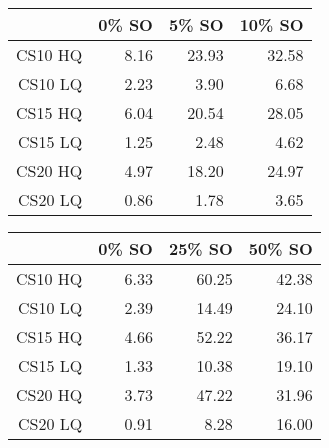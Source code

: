 \begin{table}[ht]
\begin{center}
\begin{tabular}{rrrr}
  \hline
 & 0\% SO & 5\% SO & 10\% SO \\
  \hline
 \small{CS10 HQ} & \small{8.16 }& \small{23.93 }& \small{32.58 }\\
 \small{CS10 LQ }& \small{2.23 }& \small{3.90 }& \small{6.68 }\\
 \small{CS15 HQ }& \small{6.04 }& \small{20.54} & \small{28.05 }\\
 \small{CS15 LQ }& \small{1.25 }& \small{2.48 }& \small{4.62 }\\
 \small{CS20 HQ }& \small{4.97 }& \small{18.20} & \small{24.97 }\\
 \small{CS20 LQ }& \small{0.86 }& \small{1.78 }& \small{3.65 }\\
   \hline
\end{tabular}
\end{center}
\end{table}
\begin{table}[ht]
\begin{center}
\begin{tabular}{rrrr}
  \hline
 & 0\% SO & 25\% SO & 50\% SO \\
  \hline
CS10 HQ & 6.33 & 60.25 & 42.38 \\
  CS10 LQ & 2.39 & 14.49 & 24.10 \\
  CS15 HQ & 4.66 & 52.22 & 36.17 \\
  CS15 LQ & 1.33 & 10.38 & 19.10 \\
  CS20 HQ & 3.73 & 47.22 & 31.96 \\
  CS20 LQ & 0.91 & 8.28 & 16.00 \\
   \hline
\end{tabular}
\end{center}
\end{table}

